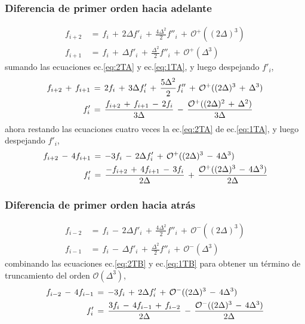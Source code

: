 \documentclass[9pt,technote,twoside,letterpaper,onecolumn]{IEEEtran}
\begin{document}
\begin{multicols}{2}
\subsubsection{Diferencia de primer orden hacia adelante}
\label{sec:dif1D2Oa}
\begin{align}
  f_{i+2}&\,=\,f_i\,+\,2\Delta f'_i\,+\,\frac{4\Delta^2}{2}f''_i\,+\,\mathcal{O}^+((2\Delta)^3)  
  \label{eq:2TA}\\
  f_{i+1}&\,=\,f_i\,+\,\Delta f'_i\,+\,\frac{\Delta^2}{2}f''_i\,+\,\mathcal{O}^+(\Delta^3)  
  \label{eq:1TA}
\end{align}
sumando las ecuaciones ec.\ref{eq:2TA} y ec.\ref{eq:1TA}, y luego despejando $f'_i$,
\begin{align}
  f_{i+2}\,+\,f_{i+1}&\,=\,2f_i\,+\,3\Delta f'_i\,+\,\frac{5\Delta^2}{2}f''_i\,+\,\mathcal{O}^+((2\Delta)^3\,+\,\Delta^3)\notag\\
  f'_i&\,=\,\frac{f_{i+2}\,+\,f_{i+1}\,-\,2f_i}{3\Delta}\,-\,\frac{\mathcal{O}^+((2\Delta)^2\,+\,\Delta^2)}{3\Delta}
    \label{eq:2ordA}
\end{align}
ahora restando las ecuaciones cuatro veces la ec.\ref{eq:2TA} de ec.\ref{eq:1TA}, y luego despejando $f'_i$,
\begin{align}
  f_{i+2}\,-\,4f_{i+1}&\,=\,-3f_i\,-\,2\Delta f'_i\,+\,\mathcal{O}^+((2\Delta)^3\,-\,4\Delta^3)\notag\\
  f'_i&\,=\,\frac{-f_{i+2}\,+\,4f_{i+1}\,-\,3f_i}{2\Delta}\,+\,\frac{\mathcal{O}^+((2\Delta)^3\,-\,4\Delta^3)}{2\Delta}
    \label{eq:2ordAO3}
\end{align}

\subsubsection{Diferencia de primer orden hacia atrás}
\label{sec:dif1D2Ob}
\begin{align}
  f_{i-2}&\,=\,f_i\,-\,2\Delta f'_i\,+\,\frac{4\Delta^2}{2}f''_i\,+\,\mathcal{O}^-((2\Delta)^3)  
  \label{eq:2TB}\\
  f_{i-1}&\,=\,f_i\,-\,\Delta f'_i\,+\,\frac{\Delta^2}{2}f''_i\,+\,\mathcal{O}^-(\Delta^3)  
  \label{eq:1TB}
\end{align}
combinando las ecuaciones ec.\ref{eq:2TB} y ec.\ref{eq:1TB} para obtener un término de truncamiento del orden $\mathcal{O}(\Delta^3)$,
\begin{align}
  f_{i-2}\,-\,4f_{i-1}&\,=\,-3f_i\,+\,2\Delta f'_i\,+\,\mathcal{O}^-((2\Delta)^3\,-\,4\Delta^3)\notag\\
  f'_i&\,=\,\frac{3f_{i}\,-\,4f_{i-1}\,+\,f_{i-2}}{2\Delta}\,-\,\frac{\mathcal{O}^-((2\Delta)^3\,-\,4\Delta^3)}{2\Delta}
    \label{eq:2ordB}
\end{align}


\end{multicols}
\end{document}
